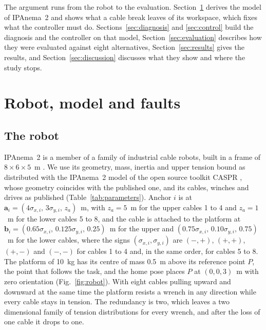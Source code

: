 \documentclass[a4paper,fleqn]{cas-dc}
\newcommand{\tablefile}[1]{\IfFileExists{tables/#1.tex}{}{}}
\newcommand{\vc}[1]{\bm{#1}}
\begin{document}
The argument runs from the robot to the evaluation. Section~\ref{sec:model} derives the model of IPAnema~2 and shows what a cable break leaves of its workspace, which fixes what the controller must do. Sections~\ref{sec:diagnosis} and \ref{sec:control} build the diagnosis and the controller on that model, Section~\ref{sec:evaluation} describes how they were evaluated against eight alternatives, Section~\ref{sec:results} gives the results, and Section~\ref{sec:discussion} discusses what they show and where the study stops.

\section{Robot, model and faults}\label{sec:model}

\subsection{The robot}\label{sec:robot}

IPAnema~2 is a member of a family of industrial cable robots, built in a frame of $8\times6\times5$~m \citep{pott2013ipanema}. We use its geometry, mass, inertia and upper tension bound as distributed with the IPAnema~2 model of the open source toolkit CASPR \citep{lau2016caspr}, whose geometry coincides with the published one, and its cables, winches and drives as published (Table~\ref{tab:parameters}). Anchor $i$ is at $\vc a_i=(4\sigma_{x,i},\,3\sigma_{y,i},\,z_{a})$~m, with $z_a=5$~m for the upper cables 1 to 4 and $z_a=1$~m for the lower cables 5 to 8, and the cable is attached to the platform at $\vc b_i=(0.65\sigma_{x,i},\,0.125\sigma_{y,i},\,0.25)$~m for the upper and $(0.75\sigma_{x,i},\,0.10\sigma_{y,i},\,0.75)$~m for the lower cables, where the signs $(\sigma_{x,i},\sigma_{y,i})$ are $(-,+)$, $(+,+)$, $(+,-)$ and $(-,-)$ for cables 1 to 4 and, in the same order, for cables 5 to 8. The platform of 10~kg has its centre of mass 0.5~m above its reference point $P$, the point that follows the task, and the home pose places $P$ at $(0,0,3)$~m with zero orientation (Fig.~\ref{fig:robot}). With eight cables pulling upward and downward at the same time the platform resists a wrench in any direction while every cable stays in tension. The redundancy is two, which leaves a two dimensional family of tension distributions for every wrench, and after the loss of one cable it drops to one.

\tablefile{tab_parameters}
\end{document}

